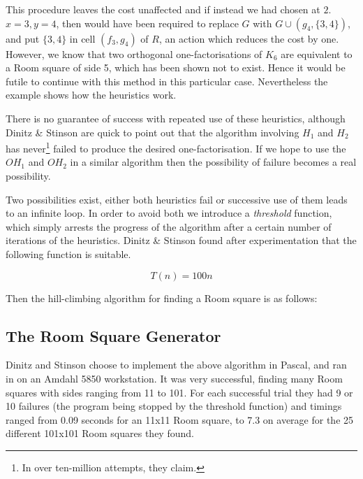 \documentclass[
  11pt,
  a4paper]{book}
\newcounter{example}
\begin{document}
\begin{example}
This procedure leaves the cost unaffected and if instead we had
chosen at $2$. $x = 3, y = 4$, then would have been required to
replace $G$ with $G \cup (g_4,\{3,4\})$, and put $\{3, 4\}$ in
cell $(f_3, g_4)$ of $R$, an action which reduces the cost by one.
However, we know that two orthogonal one-factorisations of $K_6$
are equivalent to a Room square of side 5, which has been shown
not to exist. Hence it would be futile to continue with this
method in this particular case. Nevertheless the example shows
how the heuristics work.
\end{example}

There is no guarantee of success with repeated use of these heuristics,
although Dinitz \& Stinson are quick to point out that the algorithm
involving \(H_1\) and \(H_2\) has never\footnote{In over ten-million
  attempts, they claim.} failed to produce the desired
one-factorisation. If we hope to use the \(OH_1\) and \(OH_2\) in a
similar algorithm then the possibility of failure becomes a real
possibility.

Two possibilities exist, either both heuristics fail or successive use
of them leads to an infinite loop. In order to avoid both we introduce a
\emph{threshold} function, which simply arrests the progress of the
algorithm after a certain number of iterations of the heuristics. Dinitz
\& Stinson found after experimentation that the following function is
suitable.

\begin{equation}
T(n) = 100n
\end{equation}

Then the hill-climbing algorithm for finding a Room square is as
follows:

\begin{algorithm}[H]
\end{algorithm}

\hypertarget{the-room-square-generator}{%
\subsection{The Room Square Generator}\label{the-room-square-generator}}

Dinitz and Stinson choose to implement the above algorithm in Pascal,
and ran in on an Amdahl 5850 workstation. It was very successful,
finding many Room squares with sides ranging from 11 to 101. For each
successful trial they had 9 or 10 failures (the program being stopped by
the threshold function) and timings ranged from 0.09 seconds for an
11x11 Room square, to 7.3 on average for the 25 different 101x101 Room
squares they found.
\end{document}
